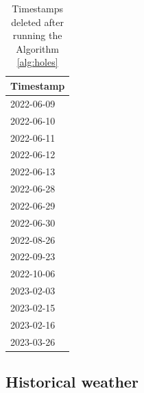 \begin{minipage}[t]{0.30\linewidth}
	\begin{table}[H]
		\centering
		\begin{tabular}[c]{l}
			\multicolumn{1}{c}{\textbf{Timestamp}} \\
			\hline
			2022-06-09                             \\
			2022-06-10                             \\
			2022-06-11                             \\
			2022-06-12                             \\
			2022-06-13                             \\
			2022-06-28                             \\
			2022-06-29                             \\
			2022-06-30                             \\
			2022-08-26                             \\
			2022-09-23                             \\
			2022-10-06                             \\
			2023-02-03                             \\
			2023-02-15                             \\
			2023-02-16                             \\
			2023-03-26                             \\
		\end{tabular}
		\caption{Timestamps deleted after running the Algorithm \ref{alg:holes}}
	\end{table}
\end{minipage}


\subsection{Historical weather}
